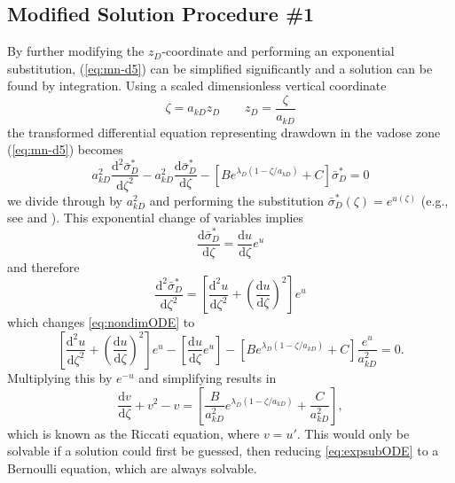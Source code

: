 \documentclass[12pt,letterpaper]{article}
\begin{document}
\subsection{Modified Solution Procedure \#1}
By further modifying the $z_D$-coordinate and performing an
exponential substitution, (\ref{eq:mn-d5}) can be simplified
significantly and a solution can be found by integration.  Using a
scaled dimensionless vertical coordinate
\begin{equation}\nonumber
 \zeta= a_{kD} z_D \qquad z_D=\frac{\zeta}{a_{kD}}
\end{equation}
the transformed differential equation representing drawdown in the
vadose zone (\ref{eq:mn-d5}) becomes
\begin{equation}
  \label{eq:nondimODE}
  a_{kD}^2 \frac{\mathrm{d}^2
    \bar{\sigma}_D^{\ast}}{\mathrm{d}\zeta^2} - a_{kD}^2
  \frac{\mathrm{d} \bar{\sigma}_D^{\ast}}{\mathrm{d}\zeta} - \left[
    B e^{\lambda_D (1-\zeta/a_{kD})} + C\right] \bar{\sigma}_D^{\ast}=0
\end{equation}
we divide through by $a_{kD}^2$ and performing the substitution
$\bar{\sigma}_D^{\ast}(\zeta)=e^{u(\zeta)}$ (e.g., see \cite[p.\
27]{bender1978advanced} and \cite[\S 60]{zwillinger1998handbook}).
This exponential change of variables implies
\begin{equation}\nonumber
\frac{\mathrm{d}\bar{\sigma}_D^{\ast}}{\mathrm{d}\zeta} =
\frac{\mathrm{d}u}{\mathrm{d}\zeta}e^u
\end{equation}
and therefore
\begin{equation}\nonumber
\frac{\mathrm{d}^2\bar{\sigma}_D^{\ast}}{\mathrm{d}\zeta^2} =
\left[ \frac{\mathrm{d}^2u}{\mathrm{d}\zeta^2} +
\left(\frac{\mathrm{d}u}{\mathrm{d}\zeta}\right)^2 \right]e^u
\end{equation}
which changes \eqref{eq:nondimODE} to
\begin{equation}\nonumber
 \left[ \frac{\mathrm{d}^2u}{\mathrm{d}\zeta^2} +
  \left(\frac{\mathrm{d}u}{\mathrm{d}\zeta}\right)^2 \right]e^u -  \left[
  \frac{\mathrm{d}u}{\mathrm{d}\zeta}e^u \right]- \left[ B e^{\lambda_D (1-\zeta/a_{kD})} + C\right] \frac{e^{u}}{a_{kD}^2} =0.
\end{equation}
Multiplying this by $e^{-u}$ and simplifying results in
\begin{equation}
  \label{eq:expsubODE}
   \frac{\mathrm{d} v}{\mathrm{d}\zeta} + v^2 - v = \left[ \frac{B}{a_{kD}^2} e^{\lambda_D (1-\zeta/a_{kD})} + \frac{C}{a_{kD}^2}\right],
\end{equation}
which is known as the Riccati equation, where $v=u'$.  This would only
be solvable if a solution could first be guessed, then reducing
\eqref{eq:expsubODE} to a Bernoulli equation, which are always
solvable.
\end{document}
